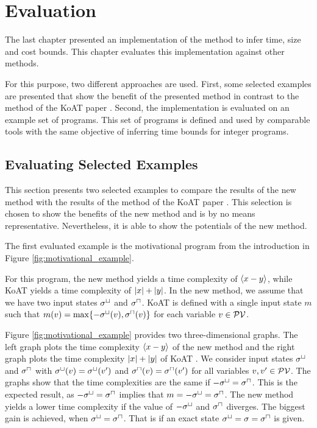 \section{Evaluation}

The last chapter presented an implementation of the method to infer time, size and cost bounds.
This chapter evaluates this implementation against other methods.

For this purpose, two different approaches are used.
First, some selected examples are presented that show the benefit of the presented method in contrast to the method of the KoAT paper \cite{koat}.
Second, the implementation is evaluated on an example set of programs.
This set of programs is defined and used by comparable tools with the same objective of inferring time bounds for integer programs.

\subsection{Evaluating Selected Examples}

This section presents two selected examples to compare the results of the new method with the results of the method of the KoAT paper \cite{koat}.
This selection is chosen to show the benefits of the new method and is by no means representative.
Nevertheless, it is able to show the potentials of the new method.

The first evaluated example is the motivational program from the introduction in Figure \ref{fig:motivational_example}.



For this program, the new method yields a time complexity of $\langle x-y\rangle$, while KoAT \cite{koat} yields a time complexity of $\left|x\right|+\left|y\right|$.
In the new method, we assume that we have two input states ${\sigma^\sqcup}$ and ${\sigma^\sqcap}$.
KoAT \cite{koat} is defined with a single input state $m$ such that $m(v) = \max \lbrace -{\sigma^\sqcup}(v),{\sigma^\sqcap}(v) \rbrace$ for each variable $v \in \mathcal{PV}$.

Figure \ref{fig:motivational_example} provides two three-dimensional graphs.
The left graph plots the time complexity $\langle x-y\rangle$ of the new method and the right graph plots the time complexity $\left|x\right|+\left|y\right|$ of KoAT \cite{koat}.
We consider input states ${\sigma^\sqcup}$ and ${\sigma^\sqcap}$ with ${\sigma^\sqcup}(v) = {\sigma^\sqcup}(v')$ and ${\sigma^\sqcap}(v) = {\sigma^\sqcap}(v')$ for all variables $v, v' \in \mathcal{PV}$.
The graphs show that the time complexities are the same if $-{\sigma^\sqcup} = {\sigma^\sqcap}$.
This is the expected result, as $-{\sigma^\sqcup} = {\sigma^\sqcap}$ implies that $m = -{\sigma^\sqcup} = {\sigma^\sqcap}$.
The new method yields a lower time complexity if the value of $-{\sigma^\sqcup}$ and ${\sigma^\sqcap}$ diverges.
The biggest gain is achieved, when ${\sigma^\sqcup} = {\sigma^\sqcap}$.
That is if an exact state ${\sigma^\sqcup} = \sigma = {\sigma^\sqcap}$ is given.

